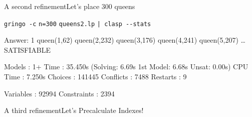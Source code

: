 \begin{frame}[fragile]{A second refinement}{Let's place \alert{$300$} queens}
\begin{block}{\alert<1>{\lstinline{gringo -c} \alert{\lstinline{n=300}} \lstinline{queens2.lp} \lstinline{| clasp --stats}}}
\vspace*{-3mm}
\pause\footnotesize%
\begin{semiverbatim}
Answer: 1
queen(1,62) queen(2,232) queen(3,176) queen(4,241) queen(5,207) \dots{}
SATISFIABLE

Models      : 1+
\alert<2-3>{Time        : 35.450s} (\alert<3>{Solving: 6.69s} 1st Model: 6.68s Unsat: 0.00s)
CPU Time    : 7.250s
Choices     : 141445
\alert<2>{Conflicts   : 7488}
Restarts    : 9

\alert<2>{Variables   : 92994}
\alert<2>{Constraints : 2394}
\end{semiverbatim}
\end{block}
\end{frame}
\begin{frame}[fragile]{A third refinement}{Let's Precalculate Indexes!}
\begin{block}{}



\end{block}
\end{frame}
